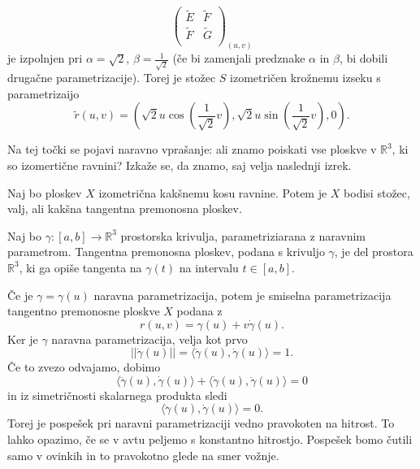 \begin{primer}
\begin{equation*}
\begin{pmatrix}
  \tilde{E} & \tilde{F}\\
  \tilde{F} & \tilde{G}\\
 \end{pmatrix}_{(u,v)}\end{equation*}je izpolnjen pri $\alpha = \sqrt{2},\, \beta = \frac{1}{\sqrt{2}}$ (če bi zamenjali predznake $\alpha$ in $\beta$, bi dobili drugačne parametrizacije).
 Torej je stožec $S$ izometričen krožnemu izseku s parametrizaijo  
 \begin{equation*} \tilde{r}(u,v) = \left(\sqrt{2}  u \cos(\frac{1}{\sqrt{2}} v), \sqrt{2}  u \sin(\frac{1}{\sqrt{2}} v), 0 \right).\end{equation*}
\end{primer}

Na tej točki se pojavi naravno vprašanje: ali znamo poiskati vse ploskve v $\mathbb{R}^3$, ki so izomertične ravnini?
Izkaže se, da znamo, saj velja naslednji izrek.

\begin{izrek}
\label{izr_izometricnost_ploskev_ravnini}
  Naj bo ploskev $X$ izometrična kakšnemu kosu ravnine. Potem je $X$ bodisi stožec, valj, ali kakšna tangentna premonosna ploskev.
\end{izrek}

\begin{definicija}
\label{def_tangentno_premonsna_ploskev}
 Naj bo $\gamma: [a,b] \to  \mathbb{R}^3$ prostorska krivulja, parametriziarana z naravnim parametrom. Tangentna premonosna ploskev,
 podana s krivuljo $\gamma$, je del prostora $\mathbb{R}^3$, ki ga opiše tangenta na $\gamma(t)$ na intervalu $t \in  [a,b]$.
\end{definicija}

Če je $\gamma = \gamma(u)$ naravna parametrizacija, potem je smiselna parametrizacija tangentno premonosne ploskve $X$
podana z 
\begin{equation*} r(u,v) = \gamma(u) + v \dot{\gamma}(u).\end{equation*}Ker je $\gamma$ naravna parametrizacija, velja kot prvo 
\begin{equation*} \lvert\lvert \dot{\gamma}(u) \rvert\rvert = \langle \dot{\gamma}(u), \dot{\gamma}(u) \rangle  = 1. \end{equation*}Če to zvezo odvajamo, dobimo 
\begin{equation*} \langle \ddot{\gamma}(u) , \dot{\gamma}(u) \rangle + \langle \dot{\gamma}(u) , \ddot{\gamma}(u) \rangle = 0  \end{equation*}
in iz simetričnosti skalarnega produkta sledi 
\begin{equation*} \langle \ddot{\gamma}(u) , \dot{\gamma}(u) \rangle = 0. \end{equation*}
Torej je pospešek pri naravni parametrizaciji vedno pravokoten na hitrost. To lahko opazimo, če se v avtu peljemo s konstantno hitrostjo. Pospešek bomo čutili
samo v ovinkih in to pravokotno glede na smer vožnje.

